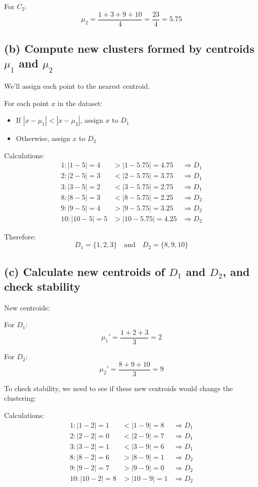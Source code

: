 \documentclass{article}
\begin{document}
For $C_2$:
\[\mu_2 = \frac{1 + 3 + 9 + 10}{4} = \frac{23}{4} = 5.75\]

\subsection*{(b) Compute new clusters formed by centroids $\mu_1$ and $\mu_2$}

We'll assign each point to the nearest centroid.

For each point $x$ in the dataset:
\begin{itemize}
    \item If $|x - \mu_1| < |x - \mu_2|$, assign $x$ to $D_1$
    \item Otherwise, assign $x$ to $D_2$
\end{itemize}

Calculations:
\begin{align*}
    1: |1 - 5| = 4 &> |1 - 5.75| = 4.75 &\Rightarrow D_1 \\
    2: |2 - 5| = 3 &< |2 - 5.75| = 3.75 &\Rightarrow D_1 \\
    3: |3 - 5| = 2 &< |3 - 5.75| = 2.75 &\Rightarrow D_1 \\
    8: |8 - 5| = 3 &< |8 - 5.75| = 2.25 &\Rightarrow D_2 \\
    9: |9 - 5| = 4 &> |9 - 5.75| = 3.25 &\Rightarrow D_2 \\
    10: |10 - 5| = 5 &> |10 - 5.75| = 4.25 &\Rightarrow D_2
\end{align*}

Therefore:
\[D_1 = \{1, 2, 3\} \quad \text{and} \quad D_2 = \{8, 9, 10\}\]

\subsection*{(c) Calculate new centroids of $D_1$ and $D_2$, and check stability}

New centroids:

For $D_1$:
\[\mu_1' = \frac{1 + 2 + 3}{3} = 2\]

For $D_2$:
\[\mu_2' = \frac{8 + 9 + 10}{3} = 9\]

To check stability, we need to see if these new centroids would change the clustering:

Calculations:
\begin{align*}
    1: |1 - 2| = 1 &< |1 - 9| = 8 &\Rightarrow D_1 \\
    2: |2 - 2| = 0 &< |2 - 9| = 7 &\Rightarrow D_1 \\
    3: |3 - 2| = 1 &< |3 - 9| = 6 &\Rightarrow D_1 \\
    8: |8 - 2| = 6 &> |8 - 9| = 1 &\Rightarrow D_2 \\
    9: |9 - 2| = 7 &> |9 - 9| = 0 &\Rightarrow D_2 \\
    10: |10 - 2| = 8 &> |10 - 9| = 1 &\Rightarrow D_2
\end{align*}
\end{document}
